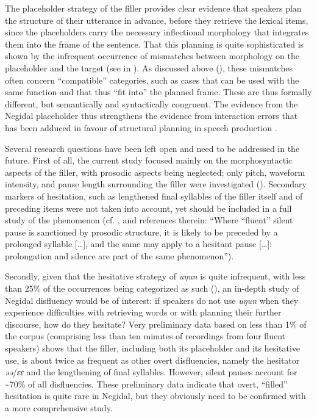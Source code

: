 \documentclass[output=paper]{langscibook}
\begin{document}
The placeholder strategy of the filler provides clear evidence that speakers plan the structure of their utterance in advance, before they retrieve the lexical items, since the placeholders carry the necessary inflectional morphology that integrates them into the frame of the sentence. That this planning is quite sophisticated is shown by the infrequent occurrence of mismatches between morphology on the placeholder and the target (see  in ). As discussed above (), these mismatches often concern “compatible” categories, such as cases that can be used with the same function and that thus “fit into” the planned frame. These are thus formally different, but semantically and syntactically congruent. The evidence from the Negidal placeholder thus strengthens the evidence from interaction errors that has been adduced in favour of structural planning in speech production \citep[419--421]{Shattuck-Hufnagel2015}.

Several research questions have been left open and need to be addressed in the future. First of all, the current study focused mainly on the morphosyntactic aspects of the filler, with prosodic aspects being neglected; only pitch, waveform intensity, and pause length surrounding the filler were investigated (). Secondary markers of hesitation, such as lengthened final syllables of the filler itself and of preceding items were not taken into account, yet should be included in a full study of the phenomenon (cf. \citealt[458]{Lickley2015}, and references therein: “Where “fluent” silent pause is sanctioned by prosodic structure, it is likely to be preceded by a prolonged syllable […], and the same may apply to a hesitant pause […]: prolongation and silence are part of the same phenomenon”). 

Secondly, given that the hesitative strategy of \textit{uŋun} is quite infrequent, with less than 25\% of the occurrences being categorized as such (), an in-depth study of Negidal disfluency would be of interest: if speakers do not use \textit{uŋun} when they experience difficulties with retrieving words or with planning their further discourse, how do they hesitate? Very preliminary data based on less than 1\% of the corpus (comprising less than ten minutes of recordings from four fluent speakers) shows that the filler, including both its placeholder and its hesitative use, is about twice as frequent as other overt disfluencies, namely the hesitator \textit{əə}/\textit{ɛɛ} and the lengthening of final syllables. However, silent pauses account for {\textasciitilde}70\% of all disfluencies. These preliminary data indicate that overt, “filled” hesitation is quite rare in Negidal, but they obviously need to be confirmed with a more comprehensive study.
\end{document}
